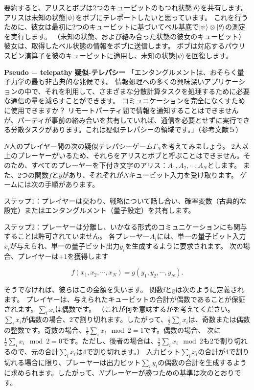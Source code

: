 要約すると、アリスとボブは2つのキュービットのもつれ状態$\ket{\theta}$を共有します。 アリスは未知の状態$\ket{\psi}$をボブにテレポートしたいと思っています。 これを行うために、彼女は最初に2つのキュービットに基づいてベル基底で$\ket{\psi} \otimes \ket{\theta}$の測定を実行します。
（未知の状態、および絡み合った状態の彼女のキュービット）
彼女は、取得したベル状態の情報をボブに送信します。 ボブは対応するパウリスピン演算子を彼のキュービットに適用し、未知の状態$\ket{\psi}$を回復します。

\textbf{Pseudo − telepathy  疑似-テレパシー}
「エンタングルメントは、おそらく量子力学の最も非古典的な兆候です。 情報処理への多くの興味深いアプリケーションの中で、それを利用して、さまざまな分散計算タスクを処理するために必要な通信の量を減らすことができます。 コミュニケーションを完全になくすために使用できますか？ リモートパーティ間で情報を通知することはできませんが、パーティが事前の絡み合いを共有していれば、通信を必要とせずに実行できる分散タスクがあります。これは疑似テレパシーの領域です。」（参考文献５）

$N$人のプレイヤー間の次の疑似テレパシーゲーム$\Gamma_N$を考えてみましょう。 2人以上のプレーヤーがいるため、それらをアリスとボブと呼ぶことはできません。そのため、すべてのプレーヤーを下付き文字のアリス：$A_1, A_2, \cdots, A_N$とします。 また、2つの関数$f$と$g$があり、それぞれが$N$キュービット入力を受け取ります。 ゲームには次の手順があります。

ステップ1：プレイヤーは交わり、戦略について話し合い、確率変数（古典的な設定）またはエンタングルメント（量子設定）を共有します。

ステップ2：プレーヤーは分離し、いかなる形式のコミュニケーションにも関与することは許可されていません。 各プレーヤー$A_i$には、単一の量子ビット入力$x_i$が与えられ、単一の量子ビット出力$y_i$を生成するように要求されます。 次の場合、プレイヤーは$+1$を獲得します

\begin{equation}
\label{197}
f(x_1, x_2, \cdots, x_N) = g(y_1, y_2, \cdots, y_N).
\end{equation}

そうでなければ、彼らはこの金額を失います。 関数fとgは次のように定義されます。 プレイヤーは、与えられたキュービットの合計が偶数であることが保証されます。$\sum_i x_i$は偶数です。
（これが何を意味するかを考えてください。$\sum_i x_i$が偶数の場合、2で割り切れます。したがって、$ \frac{1}{2} \sum_i x_i$は、奇数または偶数の整数です。奇数の場合、$ \frac{1}{2} \sum_i x_i \mod 2 = 1$です。偶数の場合、 次に$ \frac{1}{2} \sum_i x_i \mod 2 = 0$です。ただし、後者の場合は、$ \frac{1}{2} \sum_i x_i \mod 2$も2で割り切れるので、元の合計$\sum_i x_i$は4で割り切れます。）
入力ビット$\sum_i x_i$の合計が4で割り切れる場合に限り、プレーヤーは出力ビット$\sum_i y_i$の偶数の合計を生成するように求められます。したがって、$N$プレーヤーが勝つための基準は次のとおりです。


